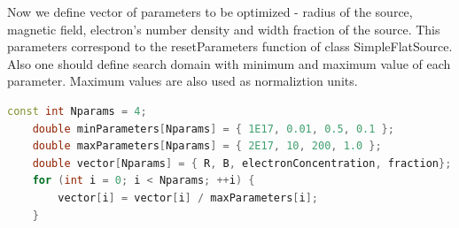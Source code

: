 Now we define vector of parameters to be optimized - radius of the source, magnetic field, electron's number density and width fraction of the source. This parameters correspond to the resetParameters function of class SimpleFlatSource. Also one should define search domain with minimum and maximum value of each parameter. Maximum values are also used as normaliztion units.

\begin{lstlisting}[language=c++]
    const int Nparams = 4;
    double minParameters[Nparams] = { 1E17, 0.01, 0.5, 0.1 };
    double maxParameters[Nparams] = { 2E17, 10, 200, 1.0 };
    double vector[Nparams] = { R, B, electronConcentration, fraction};
    for (int i = 0; i < Nparams; ++i) {
	    vector[i] = vector[i] / maxParameters[i];
    }
\end{lstlisting}

